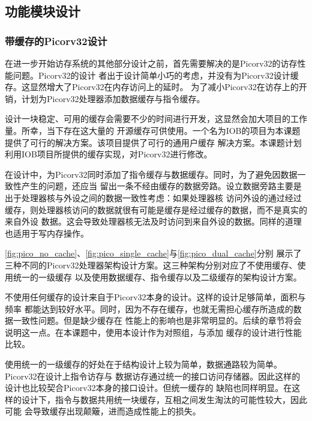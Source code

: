 \subsection{功能模块设计}
\label{section:design_module}

\subsubsection{带缓存的Picorv32设计}

在进一步开始访存系统的其他部分设计之前，首先需要解决的是Picorv32的访存性能问题。Picorv32的设计
者出于设计简单小巧的考虑，并没有为Picorv32设计缓存。这显然增大了Picorv32在内存访问上的延时。
为了减小Picorv32在访存上的开销，计划为Picorv32处理器添加数据缓存与指令缓存。

设计一块稳定、可用的缓存会需要不少的时间进行开发，这显然会加大项目的工作量。所幸，当下存在这大量的
开源缓存可供使用。一个名为IOB的项目为本课题提供了可行的解决方案。该项目提供了可行的通用户缓存
解决方案。本课题计划利用IOB项目所提供的缓存实现，对Picorv32进行修改。

在设计中，为Picorv32同时添加了指令缓存与数据缓存。同时，为了避免因数据一致性产生的问题，还应当
留出一条不经由缓存的数据旁路。设立数据旁路主要是出于处理器核与外设之间的数据一致性考虑：如果处理器核
访问外设的通过经过缓存，则处理器核访问的数据就很有可能是缓存是经过缓存的数据，而不是真实的来自外设
数据。这会导致处理器核无法及时访问到来自外设的数据。同样的道理也适用于写内存操作。




\autoref{fig:pico_no_cache}、\autoref{fig:pico_single_cache}与\autoref{fig:pico_dual_cache}分别
展示了三种不同的Picorv32处理器架构设计方案。这三种架构分别对应了不使用缓存、使用统一的一级缓存
以及使用数据缓存、指令缓存以及二级缓存的架构设计方案。

不使用任何缓存的设计来自于Picorv32本身的设计\cite{picorv32}。这样的设计足够简单，面积与频率
都能达到较好水平。同时，因为不存在缓存，也就无需担心缓存所造成的数据一致性问题。但是缺少缓存在
性能上的影响也是非常明显的。后续的章节将会说明这一点。在本课题中，使用本设计作为对照组，与添加
缓存的设计进行性能比较。

使用统一的一级缓存的好处在于结构设计上较为简单，数据通路较为简单。Picorv32在设计上指令访存与
数据访存通过统一的接口访问存储器。因此这样的设计也比较契合Picorv32本身的接口设计。但统一缓存的
缺陷也同样明显。在这样的设计下，指令与数据共用统一块缓存，互相之间发生淘汰的可能性较大，因此可能
会导致缓存出现颠簸，进而造成性能上的损失。

